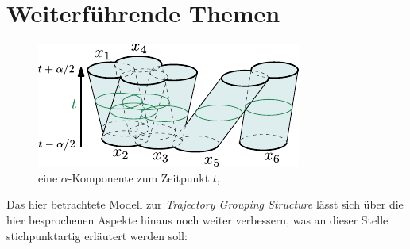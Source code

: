 \section{Weiterführende Themen}
\begin{figure}[tp]
    \Centering
    \includegraphics[width=.5\textwidth]{Bilder/alpha-component}
    \caption{eine $\alpha$-Komponente zum Zeitpunkt $t$, \cite[Fig:~11]{buchin2015}}\label{fig:alpha}
\end{figure}
Das hier betrachtete Modell zur \emph{Trajectory Grouping Structure} lässt sich über die hier besprochenen Aspekte hinaus noch weiter verbessern, was an dieser Stelle stichpunktartig erläutert werden soll:
